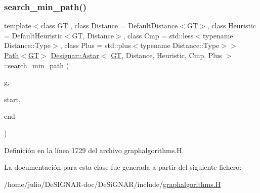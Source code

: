 \subsubsection{\texorpdfstring{search\+\_\+min\+\_\+path()}{search\_min\_path()}}
{\footnotesize\ttfamily template$<$class GT , class Distance  = Default\+Distance$<$\+G\+T$>$, class Heuristic  = Default\+Heuristic$<$\+G\+T, Distance$>$, class Cmp  = std\+::less$<$typename Distance\+::\+Type$>$, class Plus  = std\+::plus$<$typename Distance\+::\+Type$>$$>$ \\
\hyperlink{class_designar_1_1_path}{Path}$<$\hyperlink{demo-buildgraph_8_c_a3001c40d2c31ca87ed96cd7d1334a55e}{GT}$>$ \hyperlink{class_designar_1_1_astar}{Designar\+::\+Astar}$<$ \hyperlink{demo-buildgraph_8_c_a3001c40d2c31ca87ed96cd7d1334a55e}{GT}, Distance, Heuristic, Cmp, Plus $>$\+::search\+\_\+min\+\_\+path (\begin{DoxyParamCaption}\item[{\hyperlink{demo-buildgraph_8_c_a3001c40d2c31ca87ed96cd7d1334a55e}{GT} \&}]{g,  }\item[{\hyperlink{class_designar_1_1_astar_a0d4cdf6b94255824c6c93e5ae18e9eb7}{Node} \&}]{start,  }\item[{\hyperlink{class_designar_1_1_astar_a0d4cdf6b94255824c6c93e5ae18e9eb7}{Node} \&}]{end }\end{DoxyParamCaption})\hspace{0.3cm}{\ttfamily [inline]}}



Definición en la línea 1729 del archivo graphalgorithms.\+H.



La documentación para esta clase fue generada a partir del siguiente fichero\+:\begin{DoxyCompactItemize}
\item 
/home/julio/\+De\+S\+I\+G\+N\+A\+R-\/doc/\+De\+Si\+G\+N\+A\+R/include/\hyperlink{graphalgorithms_8_h}{graphalgorithms.\+H}\end{DoxyCompactItemize}
